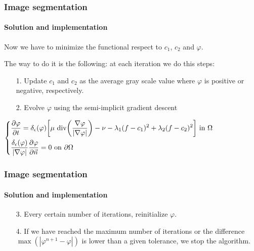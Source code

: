 \documentclass[11pt]{beamer}
\begin{document}
\begin{frame}
\frametitle{Image segmentation}
\framesubtitle{Solution and implementation}
Now we have to minimize the functional respect to $c_1$, $c_2$ and $\varphi$.

The way to do it is the following: at each iteration we do this steps:
\begin{enumerate}
\item[1.] Update $c_1$ and $c_2$ as the average gray scale value where $\varphi$ is positive or negative, respectively.

\item [2.] Evolve $\varphi$ using the semi-implicit gradient descent 


\end{enumerate}
\begin{flushleft}
$
\begin{dcases}
\frac{\partial \varphi}{\partial t} = \delta_{\epsilon}(\varphi)\bigg[\mu \text{ div}\bigg(\frac{\nabla\varphi}{|\nabla\varphi|}\bigg) - \nu-\lambda_1(f-c_1)^2+\lambda_2(f-c_2)^2\bigg]\ \text{in }\Omega \\
\frac{\delta_{\epsilon}(\varphi)}{|\nabla\varphi|}\frac{\partial \varphi}{\partial \vec{n}} = 0\ \text{on }\partial\Omega 
\end{dcases}$
\end{flushleft}

\end{frame}
\begin{frame}
\frametitle{Image segmentation}
\framesubtitle{Solution and implementation}
\begin{itemize}
\item [3.] Every certain number of iterations, reinitialize $\varphi$.
\item [4.] If we have reached the maximum number of iterations or the difference $\max(|\varphi^{n+1}-\varphi|)$ is lower than a given tolerance, we stop the algorithm.
\end{itemize}
\end{frame}
\end{document}
